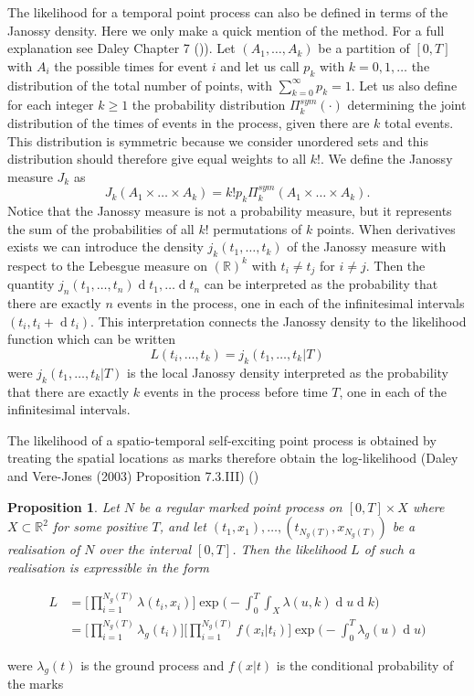 \documentclass[11pt,a4paper]{article}
\renewcommand{\d}[1]{\ensuremath{\operatorname{d}\!{#1}}}
\newtheorem{proposition}[theorem]{Proposition}
\begin{document}
The likelihood for a temporal point process can also be defined in terms of the Janossy density. Here we only make a quick mention of the method. For a full explanation see Daley Chapter 7 (\cite{Daley})).
Let $(A_1, \dots, A_k)$ be a partition of $[0, T]$ with $A_i$ the possible times for event $i$ and let us call $p_k$ with $k = 0, 1, \dots$ the distribution of the total number of points, with $\sum_{k=0}^\infty p_k = 1$. Let us also define for each integer $k \geq 1$ the probability distribution $\Pi_k^{sym}(\cdot)$ determining the joint distribution of the times of events in the process, given there are $k$ total events. This distribution is symmetric because we consider unordered sets and this distribution should therefore give equal weights to all $k!$. We define the Janossy measure $J_k$ as
\begin{equation*}
    J_k(A_1 \times \dots \times A_k) = k!p_k\Pi_k^{sym}(A_1 \times \dots \times A_k).
\end{equation*}
Notice that the Janossy measure is not a probability measure, but it represents the sum of the probabilities of all $k!$ permutations of $k$ points. 
When derivatives exists we can introduce the density $j_k(t_1, \dots, t_k)$ of the Janossy measure with respect to the Lebesgue measure on $(\mathbb{R})^k$ with $t_i \neq t_j$ for $i \neq j$. Then the quantity $j_n(t_1, \dots, t_n)\d t_1, \dots \d t_n$ can be interpreted as the probability that there are exactly $n$ events in the process, one in each of the infinitesimal intervals $(t_i, t_i+\d t_i)$. This interpretation connects the Janossy density to the likelihood function which can be written
\begin{equation*}
    L(t_i,\dots, t_k) = j_k(t_1, \dots, t_k | T)
\end{equation*}
were $j_k(t_1, \dots, t_k | T)$ is the local Janossy density interpreted as the probability that there are exactly $k$ events in the process before time $T$, one in each of the infinitesimal intervals.

The likelihood of a spatio-temporal self-exciting point process is obtained by treating the spatial locations as marks therefore obtain the log-likelihood (Daley and Vere-Jones (2003) Proposition 7.3.III) (\cite{Daley})

\begin{proposition}
    Let $N$ be a regular marked point process on $[0, T] \times X$ where $X \subset \mathbb{R}^2$ for some positive $T$, and let $(t_1, x_1), \dots, (t_{N_g(T)}, x_{N_g(T)})$ be a realisation of $N$ over the interval $[0, T]$. Then the likelihood $L$ of such a realisation is expressible  in the form
    
    \begin{align*}
        L &= \Bigg[ \prod_{i=1}^{N_g(T)} \lambda(t_i, x_i) \Bigg]\exp \Bigg( -\int_{0}^{T} \int_X \lambda(u, k) \d u \d k \Bigg) \\
        &= \Bigg[ \prod_{i=1}^{N_g(T)} \lambda_g(t_i) \Bigg] \Bigg[ \prod_{i=1}^{N_g(T)} f(x_i | t_i) \Bigg]\exp \Bigg( -\int_{0}^{T} \lambda_g(u) \d u \Bigg)
    \end{align*}
\end{proposition}
were $\lambda_g(t)$ is the ground process and $f(x | t)$ is the conditional probability of the marks 
\end{document}
